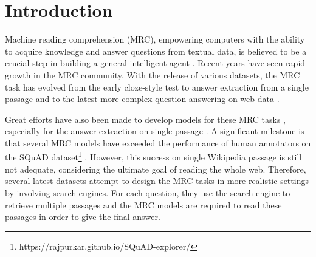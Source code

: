 \section{Introduction}
\label{introduction}


%


Machine reading comprehension (MRC), empowering computers with the ability to acquire knowledge and answer questions from textual data, is believed to be a crucial step in building a general intelligent agent \cite{cnn-dm-examination}. Recent years have seen rapid growth in the MRC community. With the release of various datasets, the MRC task has evolved from the early cloze-style test \cite{cnn-dm,cbt} to answer extraction from a single passage \cite{squad} and to the latest more complex question answering on web data \cite{marco, searchqa, dureader}. 

Great efforts have also been made to develop models for these MRC tasks 
, especially for the answer extraction on single passage \cite{match-lstm, bidaf, memen}. A significant milestone is that several MRC models have exceeded the performance of human annotators on the SQuAD dataset\footnote{https://rajpurkar.github.io/SQuAD-explorer/} \cite{squad}. However, this success on single Wikipedia passage is still not adequate, considering the ultimate goal of reading the whole web. Therefore, several latest datasets \cite{marco, dureader, searchqa} attempt to design the MRC tasks in more realistic settings by involving search engines. For each question, they use the search engine to retrieve multiple passages and the MRC models are required to read these passages in order to give the final answer.

